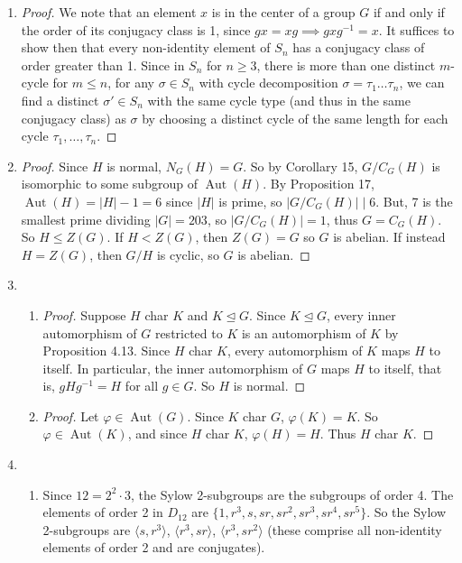 \documentclass[11pt, letterpaper]{article}
\begin{document}
\begin{enumerate}
  \item \begin{proof}
    We note that an element $x$ is in the center of a group $G$ if and only if the order of its conjugacy class is 1, since $gx = xg \implies gxg^{-1} = x$. It suffices to show then that every non-identity element of $S_n$ has a conjugacy class of order greater than 1. Since in $S_n$ for $n \geq 3$, there is more than one distinct $m$-cycle for $m \leq n$, for any $\sigma \in S_n$ with cycle decomposition $\sigma = \tau_1\dots\tau_n$, we can find a distinct $\sigma' \in S_n$ with the same cycle type (and thus in the same conjugacy class) as $\sigma$ by choosing a distinct cycle of the same length for each cycle $\tau_1, \dots, \tau_n$.
  \end{proof}
  \item \begin{proof}
    Since $H$ is normal, $N_G(H) = G$. So by Corollary 15, $G/C_G(H)$ is isomorphic to some subgroup of $\operatorname{Aut}(H)$. By Proposition 17, $\operatorname{Aut}(H) = \vert H \vert - 1 = 6$ since $\vert H \vert$ is prime, so $\vert G/C_G(H) \vert \mid 6$. But, 7 is the smallest prime dividing $\vert G \vert = 203$, so $\vert G/C_G(H) \vert = 1$, thus $G = C_G(H)$. So $H \leq Z(G)$. If $H < Z(G)$, then $Z(G) = G$ so $G$ is abelian. If instead $H = Z(G)$, then $G/H$ is cyclic, so $G$ is abelian.
  \end{proof}
  \item \begin{enumerate}
    \item \begin{proof}
      Suppose $H$ char $K$ and $K \trianglelefteq G$. Since $K \trianglelefteq G$, every inner automorphism of $G$ restricted to $K$ is an automorphism of $K$ by Proposition 4.13. Since $H$ char $K$, every automorphism of $K$ maps $H$ to itself. In particular, the inner automorphism of $G$ maps $H$ to itself, that is, $gHg^{-1} = H$ for all $g \in G$. So $H$ is normal.
    \end{proof}
    \item \begin{proof}
      Let $\varphi \in \operatorname{Aut}(G)$. Since $K$ char $G$, $\varphi(K) = K$. So $\varphi \in \operatorname{Aut}(K)$, and since $H$ char $K$, $\varphi(H) = H$. Thus $H$ char $K$.
    \end{proof}
  \end{enumerate}

  \item \begin{enumerate}
    \item Since $12 = 2^2 \cdot 3$, the Sylow 2-subgroups are the subgroups of order 4. The elements of order 2 in $D_{12}$ are $\lbrace 1, r^3, s, sr, sr^2, sr^3, sr^4, sr^5 \rbrace$. So the Sylow 2-subgroups are $\langle s, r^3 \rangle$, $\langle r^3, sr \rangle$, $\langle r^3, sr^2 \rangle$ (these comprise all non-identity elements of order 2 and are conjugates).
    

\end{enumerate}
\end{enumerate}
\end{document}

